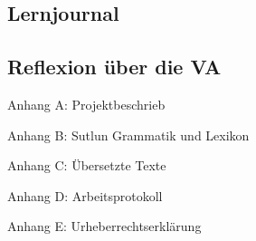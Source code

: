 \documentclass{article}
\begin{document}
\subsection{Lernjournal}

\subsection{Reflexion über die VA}







\renewcommand{\section}[1]{\newpage\vspace*{\fill}\Huge{#1}\vspace*{\fill}}

\section{Anhang A: Projektbeschrieb}


\section{Anhang B: Sutlun Grammatik und Lexikon}


\section{Anhang C: Übersetzte Texte}


\section{Anhang D: Arbeitsprotokoll}


\section{Anhang E: Urheberrechtserklärung}

\end{document}
